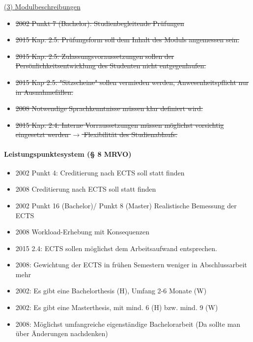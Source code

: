         \underline{(3) Modulbeschreibungen}
          \begin{itemize}
            \item \sout{2002 Punkt 7 (Bachelor): Studienbegleitende Prüfungen}
            \item \sout{2015 Kap. 2.5: Prüfungsform soll dem Inhalt des Moduls angemessen sein.}
            \item \sout{2015 Kap. 2.5: Zulassungsvoraussetzungen sollen der Persönlichkeitsentwicklung des Studenten nicht entgegenlaufen.}
            \item \sout{2015 Kap 2.5:  "Sitzscheine" sollen vermieden werden, Anwesenheitspflicht nur in Ausnahmefällen.}
            \item \sout{2008 Notwendige Sprachkenntnisse müssen klar definiert wird.}
            \item \sout{2015 Kap. 2.4: Interne Vorraussetzungen müssen möglichst vorsichtig eingesetzt werden $\rightarrow$ Flexibilität des Studienablaufs.}
          \end{itemize}




    \paragraph*{Leistungspunktesystem (§ 8 MRVO)}
      \begin{itemize}
        \item 2002 Punkt 4: Creditierung nach ECTS soll statt finden
        \item 2008 Creditierung nach ECTS soll statt finden
        \item 2002 Punkt 16 (Bachelor)/ Punkt 8 (Master) Realistische Bemessung der ECTS
        \item 2008 Workload-Erhebung mit Konsequenzen
        \item 2015 2.4: ECTS sollen möglichst dem Arbeitsaufwand entsprechen.
        \item 2008: Gewichtung der ECTS in frühen Semestern weniger in Abschlussarbeit mehr
        \item 2002: Es gibt eine Bachelorthesis (H), Umfang 2-6 Monate (W)
        \item 2002: Es gibt eine Masterthesis, mit mind. 6 (H) bzw. mind. 9 (W)
        \item 2008: Möglichst umfangreiche eigenständige Bachelorarbeit (Da sollte man über Änderungen nachdenken)
      \end{itemize}

